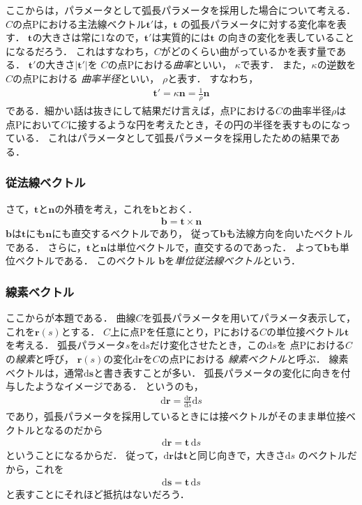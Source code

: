 ここからは，パラメータとして弧長パラメータを採用した場合について考える．
$C$の点Pにおける主法線ベクトル$\bm{t}'$は，$\bm{t}$
の弧長パラメータに対する変化率を表す．
$\bm{t}$の大きさは常に1なので，$\bm{t}'$は実質的には$\bm{t}$
の向きの変化を表していることになるだろう．
これはすなわち，$C$がどのくらい曲がっているかを表す量である．
$\bm{t}'$の大きさ$\lvert \bm{t}' \rvert$を
$C$の点Pにおける\emph{曲率}といい，
$\kappa$で表す．
また，$\kappa$の逆数を$C$の点Pにおける
\emph{曲率半径}といい，
$\rho$と表す．
すなわち，
\begin{align}
\bm{t}' = \kappa \bm{n} = \frac{1}{\rho} \bm{n}
\label{eq:kyokuritu}
\end{align}
である．細かい話は抜きにして結果だけ言えば，点Pにおける$C$の曲率半径$\rho$は
点Pにおいて$C$に接するような円を考えたとき，その円の半径を表すものになっている．
これはパラメータとして弧長パラメータを採用したための結果である．

\subsubsection{従法線ベクトル}
さて，$\bm{t}$と$\bm{n}$の外積を考え，これを$\bm{b}$とおく．
\begin{align}
\bm{b} = \bm{t} \times \bm{n} 
\label{eq:juhousen}
\end{align}
$\bm{b}$は$\bm{t}$にも$\bm{n}$にも直交するベクトルであり，
従って$\bm{b}$も法線方向を向いたベクトルである．
さらに，$\bm{t}$と$\bm{n}$は単位ベクトルで，直交するのであった．
よって$\bm{b}$も単位ベクトルである．
このベクトル
$\bm{b}$を\emph{単位従法線ベクトル}という．

\subsubsection{線素ベクトル}
ここからが本題である．
曲線$C$を弧長パラメータを用いてパラメータ表示して，これを$\bm{r} (s)$とする．
$C$上に点Pを任意にとり，Pにおける$C$の単位接ベクトル$\bm{t}$を考える．
弧長パラメータ$s$を$\mathrm{d} s$だけ変化させたとき，この$\mathrm{d}s$を
点Pにおける$C$の\emph{線素}と呼び，
$\bm{r}(s)$の変化$\mathrm{d} \bm{r}$を$C$の点Pにおける
\emph{線素ベクトル}と呼ぶ．
線素ベクトルは，通常$\mathrm{d} \bm{s}$と書き表すことが多い．
弧長パラメータの変化に向きを付与したようなイメージである．
というのも，
\begin{align*}
\mathrm{d} \bm{r} = \frac{ \mathrm{d} \bm{r} } { \mathrm{d} s} \mathrm{d} s
\end{align*}
であり，弧長パラメータを採用しているときには接ベクトルがそのまま単位接ベクトルとなるのだから
\begin{align*}
\mathrm{d} \bm{r} = \bm{t} \, \mathrm{d} s
\end{align*}
ということになるからだ．
従って，$\mathrm{d} \bm{r}$は$\bm{t}$と同じ向きで，大きさ$\mathrm{d} s$
のベクトルだから，これを
\begin{align}
\mathrm{d} \bm{s} = \bm{t} \, \mathrm{d} s
\label{eq:sensovec}
\end{align}
と表すことにそれほど抵抗はないだろう．

